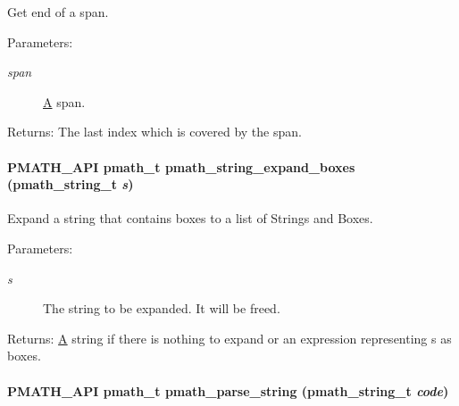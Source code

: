 Get end of a span. 

\begin{Desc}
\item[Parameters:]
\begin{description}
\item[{\em span}]\hyperlink{class_a}{A} span. \end{description}
\end{Desc}
\begin{Desc}
\item[Returns:]The last index which is covered by the span. \end{Desc}
\hypertarget{group__parser_g78a874e9d0b6aca112bad336d319a1c1}{
\paragraph[{pmath\_\-string\_\-expand\_\-boxes}]{\setlength{\rightskip}{0pt plus 5cm}PMATH\_\-API {\bf pmath\_\-t} pmath\_\-string\_\-expand\_\-boxes ({\bf pmath\_\-string\_\-t} {\em s})}\hfill}
\label{group__parser_g78a874e9d0b6aca112bad336d319a1c1}


Expand a string that contains boxes to a list of Strings and Boxes. 

\begin{Desc}
\item[Parameters:]
\begin{description}
\item[{\em s}]The string to be expanded. It will be freed. \end{description}
\end{Desc}
\begin{Desc}
\item[Returns:]\hyperlink{class_a}{A} string if there is nothing to expand or an expression representing s as boxes. \end{Desc}
\hypertarget{group__parser_g30c73f2fbcd116125cb5befd26b35ec4}{
\paragraph[{pmath\_\-parse\_\-string}]{\setlength{\rightskip}{0pt plus 5cm}PMATH\_\-API {\bf pmath\_\-t} pmath\_\-parse\_\-string ({\bf pmath\_\-string\_\-t} {\em code})}\hfill}
\label{group__parser_g30c73f2fbcd116125cb5befd26b35ec4}


